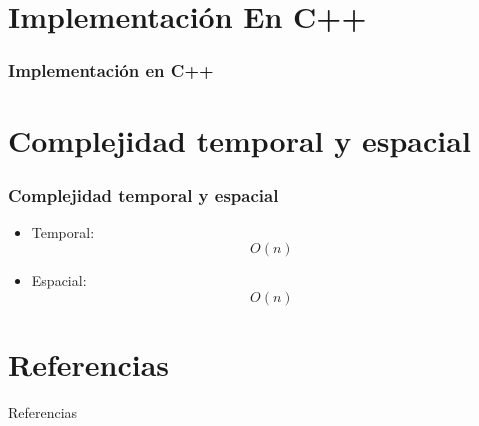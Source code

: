 \documentclass[17pt, t, lualatex]{beamer}
\begin{document}
\section{Implementación En C++}

\insertsectionpage

\begin{frame}
  \frametitle{Implementación en C++}

 \scalebox{0.4}{}

\end{frame}

\section{Complejidad temporal y espacial}

\insertsectionpage

\begin{frame}
  \frametitle{Complejidad temporal y espacial}

  \begin{itemize}
    \item Temporal:
          \[O(n)\]
    \item Espacial:
          \[O(n)\]
  \end{itemize}

\end{frame}








\section{Referencias}

\insertsectionpage
\begin{frame}[allowframebreaks]{Referencias}
  \printbibliography
\end{frame}


\insertendpage
\end{document}
